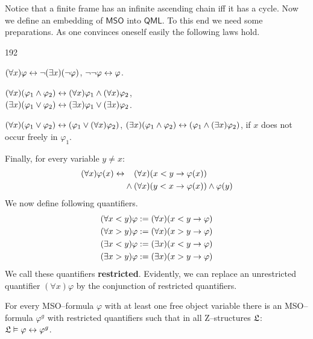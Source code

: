Notice that a finite frame has an infinite ascending chain iff 
it has a cycle. Now we define an embedding of $\mathsf{MSO}$ into 
$\mathsf{QML}$. To this end we need some preparations. As one convinces 
oneself easily the following laws hold.
\begin{dingautolist}{192}
\item $(\forall x)\varphi \leftrightarrow \neg (\exists x)(\neg
        \varphi)$, $\neg\neg \varphi \leftrightarrow \varphi$.
\item $(\forall x)(\varphi_1 \wedge \varphi_2) \leftrightarrow
	(\forall x)\varphi_1 \wedge (\forall x)\varphi_2$, \\
        $(\exists x)(\varphi_1 \vee \varphi_2)
	\leftrightarrow (\exists x)\varphi_1 \vee (\exists x)\varphi_2$.
\item $(\forall x)(\varphi_1 \vee \varphi_2) \leftrightarrow
	(\varphi_1 \vee (\forall x)\varphi_2)$,
	$(\exists x)(\varphi_1 \wedge \varphi_2) \leftrightarrow
	(\varphi_1 \wedge (\exists x)\varphi_2)$,
        if $x$ does not occur freely in $\varphi_1$.
\end{dingautolist}
Finally, for every variable $y \neq x$:
\begin{align}
(\forall x)\varphi(x) \dpf & \phantom{\mbox{}\und\mbox{}}
    (\forall x)(x < y \pf \varphi(x)) 
\\\notag
   & \und (\forall x)(y < x \pf \varphi(x)) \und \varphi(y)
\end{align}
We now define following quantifiers.
\begin{equation}
\begin{split}
(\forall x < y)\varphi & := (\forall x)(x < y \rightarrow \varphi) \\
(\forall x > y)\varphi & := (\forall x)(x > y \rightarrow \varphi) \\
(\exists x < y)\varphi & := (\exists x)(x < y \rightarrow \varphi) \\
(\exists x > y)\varphi & := (\exists x)(x > y \rightarrow \varphi)
\end{split}
\end{equation}
We call these quantifiers \textbf{restricted}. Evidently, we can
replace an unrestricted quantifier $(\forall x)\varphi$
by the conjunction of restricted quantifiers.  
\begin{lem}
For every MSO--formula $\varphi$ with at least one free
object variable there is an MSO--formula
$\varphi^g$ with restricted quantifiers such that
in all Z--struc\-tu\-res $\mathfrak{L}$: $\mathfrak{L} \vDash \varphi \leftrightarrow \varphi^g$.
\end{lem}

